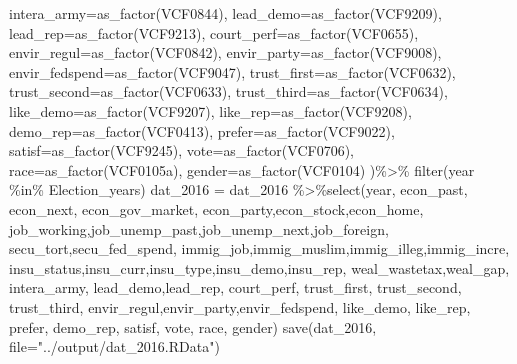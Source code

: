 \documentclass[
]{article}
\newenvironment{Shaded}{\begin{snugshade}}{\end{snugshade}}
\newcommand{\AttributeTok}[1]{\textcolor[rgb]{0.77,0.63,0.00}{#1}}
\newcommand{\FunctionTok}[1]{\textcolor[rgb]{0.00,0.00,0.00}{#1}}
\newcommand{\NormalTok}[1]{#1}
\newcommand{\OtherTok}[1]{\textcolor[rgb]{0.56,0.35,0.01}{#1}}
\newcommand{\SpecialCharTok}[1]{\textcolor[rgb]{0.00,0.00,0.00}{#1}}
\newcommand{\StringTok}[1]{\textcolor[rgb]{0.31,0.60,0.02}{#1}}
\begin{document}
\begin{Shaded}
\begin{Highlighting}[]
    \AttributeTok{intera\_army=}\FunctionTok{as\_factor}\NormalTok{(VCF0844),}
    \AttributeTok{lead\_demo=}\FunctionTok{as\_factor}\NormalTok{(VCF9209),}
    \AttributeTok{lead\_rep=}\FunctionTok{as\_factor}\NormalTok{(VCF9213),}
    \AttributeTok{court\_perf=}\FunctionTok{as\_factor}\NormalTok{(VCF0655),}
    \AttributeTok{envir\_regul=}\FunctionTok{as\_factor}\NormalTok{(VCF0842),}
    \AttributeTok{envir\_party=}\FunctionTok{as\_factor}\NormalTok{(VCF9008),}
    \AttributeTok{envir\_fedspend=}\FunctionTok{as\_factor}\NormalTok{(VCF9047),}
    \AttributeTok{trust\_first=}\FunctionTok{as\_factor}\NormalTok{(VCF0632),}
    \AttributeTok{trust\_second=}\FunctionTok{as\_factor}\NormalTok{(VCF0633),}
    \AttributeTok{trust\_third=}\FunctionTok{as\_factor}\NormalTok{(VCF0634),}
    \AttributeTok{like\_demo=}\FunctionTok{as\_factor}\NormalTok{(VCF9207),}
    \AttributeTok{like\_rep=}\FunctionTok{as\_factor}\NormalTok{(VCF9208),}
    \AttributeTok{demo\_rep=}\FunctionTok{as\_factor}\NormalTok{(VCF0413),}
    \AttributeTok{prefer=}\FunctionTok{as\_factor}\NormalTok{(VCF9022),}
    \AttributeTok{satisf=}\FunctionTok{as\_factor}\NormalTok{(VCF9245),}
    \AttributeTok{vote=}\FunctionTok{as\_factor}\NormalTok{(VCF0706),}
    \AttributeTok{race=}\FunctionTok{as\_factor}\NormalTok{(VCF0105a),}
    \AttributeTok{gender=}\FunctionTok{as\_factor}\NormalTok{(VCF0104)}
\NormalTok{  )}\SpecialCharTok{\%\textgreater{}\%}
  \FunctionTok{filter}\NormalTok{(year }\SpecialCharTok{\%in\%}\NormalTok{ Election\_years)}
\NormalTok{dat\_2016 }\OtherTok{=}\NormalTok{ dat\_2016 }\SpecialCharTok{\%\textgreater{}\%}\FunctionTok{select}\NormalTok{(year, }
\NormalTok{                             econ\_past, econ\_next, econ\_gov\_market, econ\_party,econ\_stock,econ\_home,}
\NormalTok{                            job\_working,job\_unemp\_past,job\_unemp\_next,job\_foreign,}
\NormalTok{                            secu\_tort,secu\_fed\_spend,}
\NormalTok{                            immig\_job,immig\_muslim,immig\_illeg,immig\_incre,}
\NormalTok{                            insu\_status,insu\_curr,insu\_type,insu\_demo,insu\_rep,}
\NormalTok{                            weal\_wastetax,weal\_gap,}
\NormalTok{                            intera\_army,}
\NormalTok{                            lead\_demo,lead\_rep,}
\NormalTok{                            court\_perf,}
\NormalTok{                            trust\_first, trust\_second, trust\_third,}
\NormalTok{                            envir\_regul,envir\_party,envir\_fedspend,}
\NormalTok{                            like\_demo, like\_rep,}
\NormalTok{                            prefer,}
\NormalTok{                            demo\_rep,}
\NormalTok{                            satisf,}
\NormalTok{                            vote, race, gender)}
\FunctionTok{save}\NormalTok{(dat\_2016, }\AttributeTok{file=}\StringTok{"../output/dat\_2016.RData"}\NormalTok{)}
\end{Highlighting}
\end{Shaded}
\end{document}
